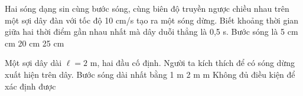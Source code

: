 \setcounter{paragraph}{0}
\setcounter{ex}{0}
\PhanI
{}
\begin{ex}%
Hai sóng dạng sin cùng bước sóng, cùng biên độ truyền ngược chiều nhau trên một sợi dây đàn với tốc độ 10 cm/s tạo ra một sóng dừng. Biết khoảng thời gian giữa hai thời điểm gần nhau nhất mà dây duỗi thẳng là 0,5 s. Bước sóng là
\choice
{5 cm}
{ cm}
{20 cm}
{25 cm}
\end{ex} 
\begin{ex}%
Một sợi dây dài $\ell=2$ m, hai đầu cố định. Người ta kích thích để có sóng dừng xuất hiện trên dây. Bước sóng dài nhất bằng
\choice
{1 m}
{2 m}
{ m}
{Không đủ điều kiện để xác định được}
\end{ex} 

